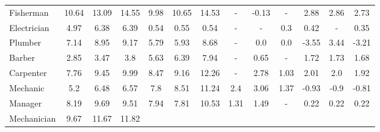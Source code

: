 \begin{table}[t]
{\begin{tabular}{l|ccc|ccc|ccc|ccc}
Fisherman
& \cellcolor{purple6} 10.64 & \cellcolor{green7} 13.09 & \cellcolor{green8} 14.55
&\cellcolor{purple5} 9.98 & \cellcolor{purple6} 10.65 & \cellcolor{purple8} 14.53
&\cellcolor{lightgray} - & \cellcolor{red1} -0.13 & \cellcolor{lightgray} -
&\cellcolor{green2} 2.88 & \cellcolor{green2} 2.86 & \cellcolor{green2} 2.73
\\
Electrician
& \cellcolor{purple3} 4.97 & \cellcolor{green4} 6.38 & \cellcolor{green4} 6.39
&\cellcolor{green1} 0.54 & \cellcolor{green1} 0.55 & \cellcolor{green1} 0.54
&\cellcolor{lightgray} - & \cellcolor{lightgray} - & \cellcolor{green1} 0.3
&\cellcolor{green1} 0.42 & \cellcolor{lightgray} - & \cellcolor{green1} 0.35
\\
Plumber
& \cellcolor{purple4} 7.14 & \cellcolor{green5} 8.95 & \cellcolor{green5} 9.17
&\cellcolor{purple3} 5.79 & \cellcolor{purple3} 5.93 & \cellcolor{green5} 8.68
&\cellcolor{lightgray} - & \cellcolor{green1} 0.0 & \cellcolor{green1} 0.0
&\cellcolor{red2} -3.55 & \cellcolor{purple2} 3.44 & \cellcolor{red2} -3.21
\\
Barber
& \cellcolor{green2} 2.85 & \cellcolor{green2} 3.47 & \cellcolor{green2} 3.8
&\cellcolor{purple3} 5.63 & \cellcolor{purple4} 6.39 & \cellcolor{green4} 7.94
&\cellcolor{lightgray} - & \cellcolor{green1} 0.65 & \cellcolor{lightgray} -
&\cellcolor{green1} 1.72 & \cellcolor{green1} 1.73 & \cellcolor{green1} 1.68
\\
Carpenter
& \cellcolor{purple4} 7.76 & \cellcolor{green5} 9.45 & \cellcolor{green5} 9.99
&\cellcolor{purple5} 8.47 & \cellcolor{purple5} 9.16 & \cellcolor{green7} 12.26
&\cellcolor{lightgray} - & \cellcolor{green2} 2.78 & \cellcolor{green1} 1.03
&\cellcolor{green2} 2.01 & \cellcolor{green2} 2.0 & \cellcolor{green1} 1.92
\\
Mechanic
& \cellcolor{purple3} 5.2 & \cellcolor{green4} 6.48 & \cellcolor{green4} 6.57
&\cellcolor{purple4} 7.8 & \cellcolor{purple5} 8.51 & \cellcolor{green6} 11.24
&\cellcolor{purple2} 2.4 & \cellcolor{purple2} 3.06 & \cellcolor{green1} 1.37
&\cellcolor{red1} -0.93 & \cellcolor{red1} -0.9 & \cellcolor{red1} -0.81
\\
Manager
& \cellcolor{purple5} 8.19 & \cellcolor{purple5} 9.69 & \cellcolor{purple5} 9.51
&\cellcolor{purple4} 7.94 & \cellcolor{purple4} 7.81 & \cellcolor{purple6} 10.53
&\cellcolor{green1} 1.31 & \cellcolor{green1} 1.49 & \cellcolor{lightgray} -
&\cellcolor{green1} 0.22 & \cellcolor{green1} 0.22 & \cellcolor{green1} 0.22
\\
Mechanician
& \cellcolor{purple5} 9.67 & \cellcolor{purple6} 11.67 & \cellcolor{purple6} 11.82

\end{tabular}}
\end{table}
